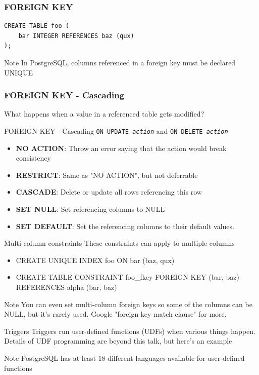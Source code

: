 \documentclass{beamer}
\begin{document}
\begin{frame}[fragile]
    \frametitle{FOREIGN KEY}
    \begin{verbatim}
CREATE TABLE foo (
    bar INTEGER REFERENCES baz (qux)
);
    \end{verbatim}
    \begin{block}{Note} In PostgreSQL, columns referenced in a foreign key must be declared UNIQUE
    \end{block}
\end{frame}

\begin{frame}
    \frametitle{FOREIGN KEY - Cascading}
    What happens when a value in a referenced table gets modified?
\end{frame}

\begin{frame}{FOREIGN KEY - Cascading}
    \texttt{ON UPDATE \emph{action}} and \texttt{ON DELETE \emph{action}}
    \begin{itemize}
        \item {\bf NO ACTION}: Throw an error saying that the action would break consistency
        \item {\bf RESTRICT}: Same as "NO ACTION", but not deferrable
        \item {\bf CASCADE}: Delete or update all rows referencing this row
        \item {\bf SET NULL}: Set referencing columns to NULL
        \item {\bf SET DEFAULT}: Set the referencing columns to their default values.
    \end{itemize}
\end{frame}

\begin{frame}{Multi-column constraints}
    These constraints can apply to multiple columns
    \begin{itemize}
        \item CREATE UNIQUE INDEX foo ON bar (baz, qux)
        \item CREATE TABLE CONSTRAINT foo\_fkey FOREIGN KEY (bar, baz) REFERENCES alpha (bar, baz)
    \end{itemize}
    \vspace{0.1\textheight}
    \begin{block}{Note}
        You can even set multi-column foreign keys so some of the columns can be NULL, but it's rarely used. Google "foreign key match clause" for more.
    \end{block}
\end{frame}

\begin{frame}{Triggers}
    Triggers run user-defined functions (UDFs) when various things happen. Details of UDF programming are beyond this talk, but here's an example
    \vspace{0.1\textheight}
    \begin{block}{Note}
        PostgreSQL has at least 18 different languages available for user-defined functions
    \end{block}
\end{frame}
\end{document}
